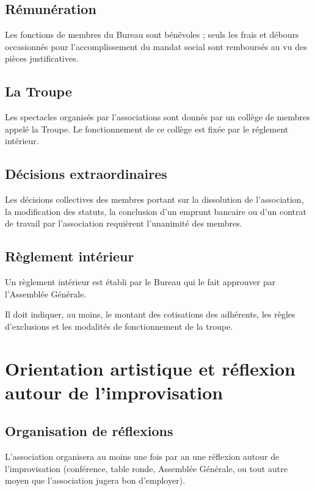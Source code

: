 \documentclass[a4paper,french,10pt]{article}
\begin{document}
\subsection{Rémunération}
\label{sec:remuneration}
Les fonctions de membres du Bureau sont bénévoles ; seuls les frais et
débours occasionnés pour l’accomplissement du mandat social sont
remboursés au vu des pièces justificatives.

\subsection{La Troupe}
\label{sec:troupe}
Les spectacles organisés par l'associations sont donnés par un collège de membres appelé \og{}la Troupe\fg{}. Le fonctionnement de ce collège est fixée par le réglement intérieur.

\subsection{Décisions extraordinaires}
\label{sec:decisions-extra}
Les décisions collectives des membres portant sur la dissolution de
l’association, la modification des statuts, la conclusion d’un emprunt
bancaire ou d’un contrat de travail par l’association requièrent
l’unanimité des membres.

\subsection{Règlement intérieur}
\label{sec:reglement}
Un règlement intérieur est établi par le Bureau qui le fait approuver
par l’Assemblée Générale.

Il doit indiquer, au moins, le montant des cotisations des adhérents, les règles d'exclusions et les modalités de fonctionnement de la troupe.


\section{Orientation artistique et réflexion autour de
  l'improvisation}

\subsection{Organisation de réflexions}
\label{sec:reflexions}
L'association organisera au moins une fois par an une réflexion autour
de l'improvisation (conférence, table ronde, Assemblée Générale, ou
tout autre moyen que l'association jugera bon d'employer).
\end{document}
